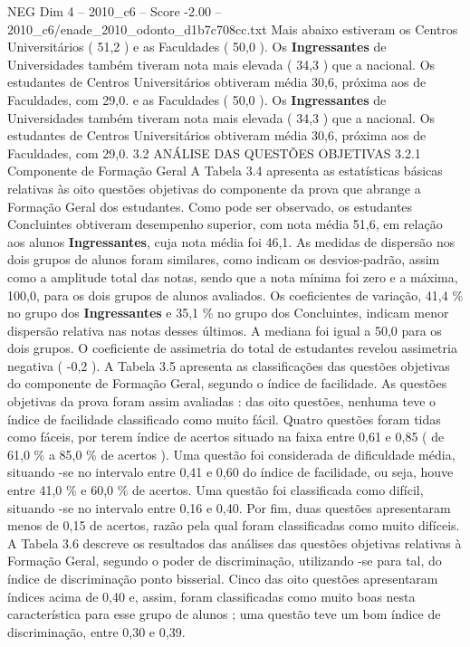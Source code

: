 \begin{textsample}{NEG Dim 4 – 2010\_c6 – Score -2.00 – 2010\_c6/enade\_2010\_odonto\_d1b7c708cc.txt}
Mais abaixo estiveram os Centros Universitários ( 51,2 ) e as Faculdades ( 50,0 ).
Os \textbf{Ingressantes} de Universidades também tiveram nota mais elevada ( 34,3 ) que a nacional.
Os estudantes de Centros Universitários obtiveram média 30,6, próxima aos de Faculdades, com 29,0. e as Faculdades ( 50,0 ).
Os \textbf{Ingressantes} de Universidades também tiveram nota mais elevada ( 34,3 ) que a nacional.
Os estudantes de Centros Universitários obtiveram média 30,6, próxima aos de Faculdades, com 29,0. 3.2 ANÁLISE DAS QUESTÕES OBJETIVAS 3.2.1 Componente de Formação Geral A Tabela 3.4 apresenta as estatísticas básicas relativas às oito questões objetivas do componente da prova que abrange a Formação Geral dos estudantes.
Como pode ser observado, os estudantes Concluintes obtiveram desempenho superior, com nota média 51,6, em relação aos alunos \textbf{Ingressantes}, cuja nota média foi 46,1.
As medidas de dispersão nos dois grupos de alunos foram similares, como indicam os desvios-padrão, assim como a amplitude total das notas, sendo que a nota mínima foi zero e a máxima, 100,0, para os dois grupos de alunos avaliados.
Os coeficientes de variação, 41,4 \% no grupo dos \textbf{Ingressantes} e 35,1 \% no grupo dos Concluintes, indicam menor dispersão relativa nas notas desses últimos.
A mediana foi igual a 50,0 para os dois grupos.
O coeficiente de assimetria do total de estudantes revelou assimetria negativa ( -0,2 ).
A Tabela 3.5 apresenta as classificações das questões objetivas do componente de Formação Geral, segundo o índice de facilidade.
As questões objetivas da prova foram assim avaliadas : das oito questões, nenhuma teve o índice de facilidade classificado como muito fácil.
Quatro questões foram tidas como fáceis, por terem índice de acertos situado na faixa entre 0,61 e 0,85 ( de 61,0 \% a 85,0 \% de acertos ).
Uma questão foi considerada de dificuldade média, situando -se no intervalo entre 0,41 e 0,60 do índice de facilidade, ou seja, houve entre 41,0 \% e 60,0 \% de acertos.
Uma questão foi classificada como difícil, situando -se no intervalo entre 0,16 e 0,40.
Por fim, duas questões apresentaram menos de 0,15 de acertos, razão pela qual foram classificadas como muito difíceis.
A Tabela 3.6 descreve os resultados das análises das questões objetivas relativas à Formação Geral, segundo o poder de discriminação, utilizando -se para tal, do índice de discriminação ponto bisserial.
Cinco das oito questões apresentaram índices acima de 0,40 e, assim, foram classificadas como muito boas nesta característica para esse grupo de alunos ; uma questão teve um bom índice de discriminação, entre 0,30 e 0,39.

\end{textsample}

